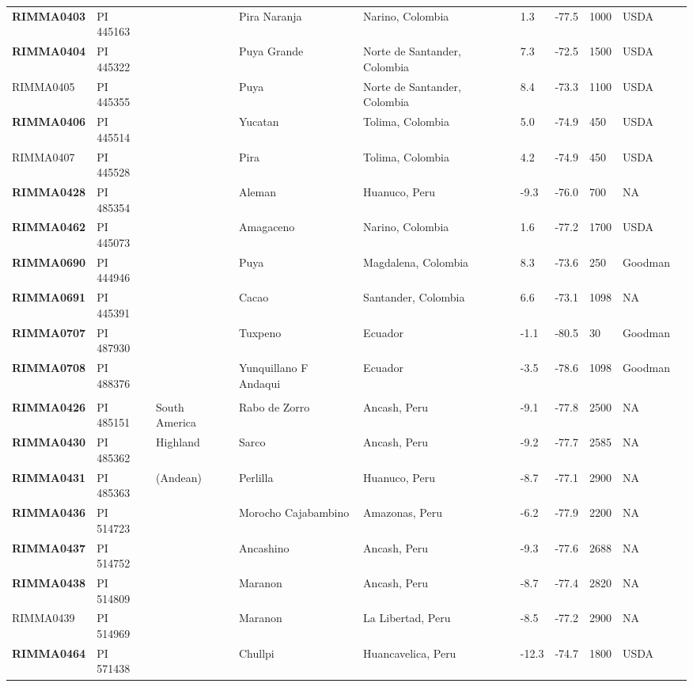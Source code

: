 \documentclass[onecolumn,oneside,letterpaper]{article}
\begin{document}
\begin{table}[h]
\begin{center}
{\begin{tabular}{llllllllll}
{\bf RIMMA0403}	&	PI 445163	&		&	Pira Naranja	&	Narino, Colombia	&	1.3 	&	-77.5 	&	1000	&	USDA	\\
{\bf RIMMA0404}	&	PI 445322	&		&	Puya Grande	&	Norte de Santander, Colombia	&	7.3 	&	-72.5 	&	1500	&	USDA	\\
RIMMA0405	&	PI 445355	&		&	Puya	&	Norte de Santander, Colombia	&	8.4 	&	-73.3 	&	1100	&	USDA	\\
{\bf RIMMA0406}	&	PI 445514	&		&	Yucatan	&	Tolima, Colombia	&	5.0 	&	-74.9 	&	450	&	USDA	\\
RIMMA0407	&	PI 445528	&		&	Pira	&	Tolima, Colombia	&	4.2 	&	-74.9 	&	450	&	USDA	\\
{\bf RIMMA0428}	&	PI 485354	&		&	Aleman	&	Huanuco, Peru	&	-9.3 	&	-76.0 	&	700	&	NA	\\
{\bf RIMMA0462}	&	PI 445073	&		&	Amagaceno	&	Narino, Colombia	&	1.6 	&	-77.2 	&	1700	&	USDA	\\
{\bf RIMMA0690}	&	PI 444946	&		&	Puya	&	Magdalena, Colombia	&	8.3 	&	-73.6 	&	250	&	Goodman	\\
{\bf RIMMA0691}	&	PI 445391	&		&	Cacao	&	Santander, Colombia	&	6.6 	&	-73.1 	&	1098	&	NA	\\
{\bf RIMMA0707}	&	PI 487930	&		&	Tuxpeno	&	Ecuador	&	-1.1 	&	-80.5 	&	30	&	Goodman	\\
{\bf RIMMA0708}	&	PI 488376	&		&	Yunquillano F Andaqui	&	Ecuador	&	-3.5 	&	-78.6 	&	1098	&	Goodman	\\
	\hline 
	& & & \\[-4mm] 
{\bf RIMMA0426}	&	PI 485151	&	South America	&	Rabo de Zorro	&	Ancash, Peru	&	-9.1 	&	-77.8 	&	2500	&	NA	\\
{\bf RIMMA0430}	&	PI 485362	&	Highland	&	Sarco	&	Ancash, Peru	&	-9.2 	&	-77.7 	&	2585	&	NA	\\
{\bf RIMMA0431}	&	PI 485363	&	(Andean)	&	Perlilla	&	Huanuco, Peru	&	-8.7 	&	-77.1 	&	2900	&	NA	\\
{\bf RIMMA0436}	&	PI 514723	&		&	Morocho Cajabambino	&	Amazonas, Peru	&	-6.2 	&	-77.9 	&	2200	&	NA	\\
{\bf RIMMA0437}	&	PI 514752	&		&	Ancashino	&	Ancash, Peru	&	-9.3 	&	-77.6 	&	2688	&	NA	\\
{\bf RIMMA0438}	&	PI 514809	&		&	Maranon	&	Ancash, Peru	&	-8.7 	&	-77.4 	&	2820	&	NA	\\
RIMMA0439	&	PI 514969	&		&	Maranon	&	La Libertad, Peru	&	-8.5 	&	-77.2 	&	2900	&	NA	\\
{\bf RIMMA0464}	&	PI 571438	&		&	Chullpi	&	Huancavelica, Peru	&	-12.3 	&	-74.7 	&	1800	&	USDA	\\

\end{tabular}}
\end{center}
\end{table}
\end{document}
